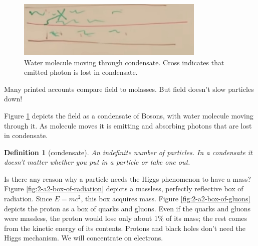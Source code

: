 \documentclass[]{article}
\newtheorem{defn}[thm]{Definition}
\begin{document}
\begin{figure}[h]
	\begin{center}
		\caption[Water molecule moving through condensate.]{Water molecule moving through condensate. Cross indicates that emitted photon is lost in condensate.}\label{fig:2-a2-water-molecule-in-condensate}
		\includegraphics[width=0.8\textwidth]{2-a2-water-molecule-in-condensate}
	\end{center}
\end{figure}

Many printed accounts compare field to molasses. But field doesn't slow particles down! 

Figure \ref{fig:2-a2-water-molecule-in-condensate} depicts the field as a condensate of Bosons, with water molecule moving through it. As molecule moves it is emitting and absorbing photons that are lost in condensate.

\begin{defn}[condensate]
	An indefinite number of particles. In a condensate it doesn't matter whether you put in a particle or take one out.
\end{defn}

Is there any reason why a particle needs the Higgs phenomenon to have a  mass? Figure \ref{fig:2-a2-box-of-radiation} depicts a massless, perfectly reflective box of radiation. Since $E=mc^2$, this box acquires mass. Figure \ref{fig:2-a2-box-of-gluons} depicts the proton as a box of quarks and gluons. Even if the quarks and gluons were massless, the proton would lose only about 1\% of its mass; the rest comes from the kinetic energy of its contents. Protons and black holes don't need the Higgs mechanism. We will concentrate on electrons.
\end{document}
